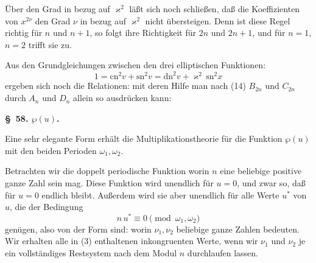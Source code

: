 
Über den Grad in bezug auf $\varkappa^2$ läßt sich noch schließen, daß die
Koeffizienten von $x^{2\nu}$ den Grad $\nu$ in bezug auf $\varkappa^2$ nicht
übersteigen. Denn ist diese Regel richtig für $n$ und $n+1$, so folgt ihre
Richtigkeit für $2n$ und $2n+1$, und für $n=1$, $n=2$ trifft sie zu.

Aus den Grundgleichungen zwischen den drei elliptischen Funktionen:
\[
1 = \mathrm{cn}^2 v + \mathrm{sn}^2 v = \mathrm{dn}^2 v + \varkappa^2\,\mathrm{sn}^2 x %
\]
ergeben sich noch die Relationen:
mit deren Hilfe man nach (14) $B_{2n}$ und $C_{2n}$ durch $A_n$ und $D_n$
allein so ausdrücken kann:

\begin{center}
\textbf{\S\ 58.  $\wp(u)$.}
\end{center}

Eine sehr elegante Form erhält die Multiplikationstheorie für die
 Funktion $\wp(u)$ mit den beiden Perioden $\omega_1,
\omega_2$.

Betrachten wir die doppelt periodische Funktion
worin $n$ eine beliebige positive ganze Zahl sein mag. Diese Funktion wird
unendlich für $u=0$, und zwar so, daß
für $u=0$ endlich bleibt. Außerdem wird sie aber unendlich für alle Werte
$u^*$ von $u$, die der Bedingung
\[
n\,u^* \equiv 0 \pmod{\omega_1,\omega_2}
\]
genügen, also von der Form sind:
worin $\nu_1, \nu_2$ beliebige ganze Zahlen bedeuten. Wir erhalten alle in
(3) enthaltenen inkongruenten Werte, wenn wir $\nu_1$ und $\nu_2$ je ein
vollständiges Restsystem nach dem Modul $n$ durchlaufen lassen.
